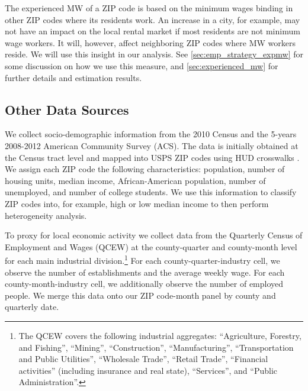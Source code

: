 The experienced MW of a ZIP code is based on the minimum wages binding in other ZIP codes 
where its residents work. An increase in a city, for example, may not have an impact on 
the local rental market if most residents are not minimum wage workers. It will, however, 
affect neighboring ZIP codes where MW workers reside. We will use this insight in our 
analysis. See \autoref{sec:emp_strategy_expmw} for some discussion on how we use this 
measure, and \autoref{sec:experienced_mw} for further details and estimation results.

\subsection{Other Data Sources}\label{sec:data/other_data}

We collect socio-demographic information from the 2010 Census and the 5-years 2008-2012 
American Community Survey (ACS). The data is initially obtained at the Census tract 
level and mapped into USPS ZIP codes using HUD crosswalks \parencite{hudCrosswalks}. We 
assign each ZIP code the following characteristics: population, number of housing units, 
median income, African-American population, number of unemployed, and number of college 
students. We use this information to classify ZIP codes into, for example, high or low median 
income to then perform heterogeneity analysis.

To proxy for local economic activity we collect data from the Quarterly Census of 
Employment and Wages (QCEW) at the county-quarter and county-month level for each main 
industrial division.\footnote{The QCEW covers the following industrial aggregates: 
	``Agriculture, Forestry, and Fishing'', ``Mining'', ``Construction'', ``Manufacturing'', 
	``Transportation and Public Utilities'', ``Wholesale Trade'', ``Retail Trade'',
	``Financial activities'' (including insurance and real state), ``Services'', and 
	``Public Administration''.} 
For each county-quarter-industry cell, we observe the number of establishments and the 
average weekly wage. For each county-month-industry cell, we additionally observe the number 
of employed people. We merge this data onto our ZIP code-month panel by county and 
quarterly date.



